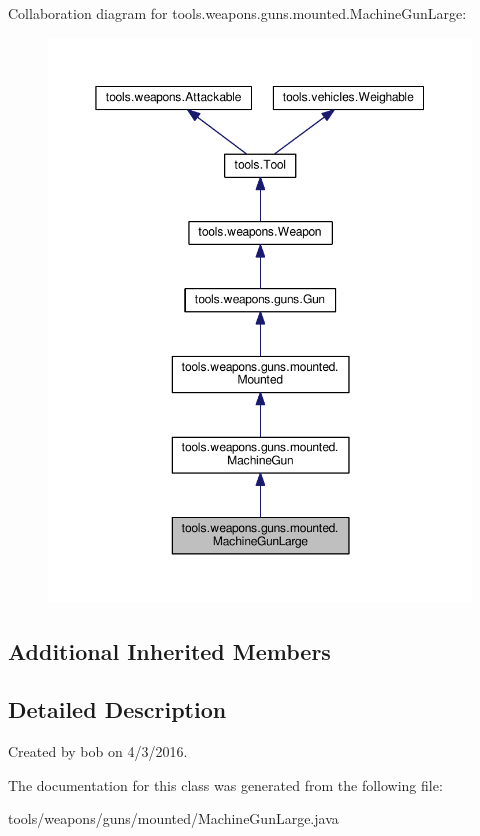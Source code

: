 Collaboration diagram for tools.\+weapons.\+guns.\+mounted.\+Machine\+Gun\+Large\+:
\nopagebreak
\begin{figure}[H]
\begin{center}
\leavevmode
\includegraphics[width=350pt]{classtools_1_1weapons_1_1guns_1_1mounted_1_1_machine_gun_large__coll__graph}
\end{center}
\end{figure}
\subsection*{Additional Inherited Members}


\subsection{Detailed Description}
Created by bob on 4/3/2016. 

The documentation for this class was generated from the following file\+:\begin{DoxyCompactItemize}
\item 
tools/weapons/guns/mounted/Machine\+Gun\+Large.\+java\end{DoxyCompactItemize}
